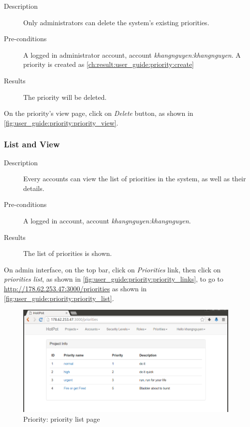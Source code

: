 \begin{description}
\item[Description] Only administrators can delete the system's existing priorities.
\item[Pre-conditions] A logged in administrator account, \eg account \emph{khangnguyen:khangnguyen}.
A priority is created as \autoref{ch:result:user_guide:priority:create}
\item[Results] The priority will be deleted.
\end{description}

On the priority's view page, click on \emph{Delete} button, as shown in \autoref{fig:user_guide:priority:priority_view}.

\subsubsection{List and View}
\label{ch:result:user_guide:priority:list}

\begin{description}
\item[Description] Every accounts can view the list of priorities in the system, as well as their details.
\item[Pre-conditions] A logged in account, \eg account \emph{khangnguyen:khangnguyen}.
\item[Results] The list of priorities is shown.
\end{description}

On admin interface, on the top bar, click on \emph{Priorities} link, then click on \emph{priorities list}, as shown in \autoref{fig:user_guide:priority:priority_links}, 
to go to \href{http://178.62.253.47:3000/priorities}{http://178.62.253.47:3000/priorities} as shown in \autoref{fig:user_guide:priority:priority_list}.

\begin{figure}[bth]
\myfloatalign
\includegraphics[width=1.0\linewidth]{gfx/chapter_5/priority/priority_list}
\caption[Priority: priority list page]{Priority: priority list page}
\label{fig:user_guide:priority:priority_list}
\end{figure}

